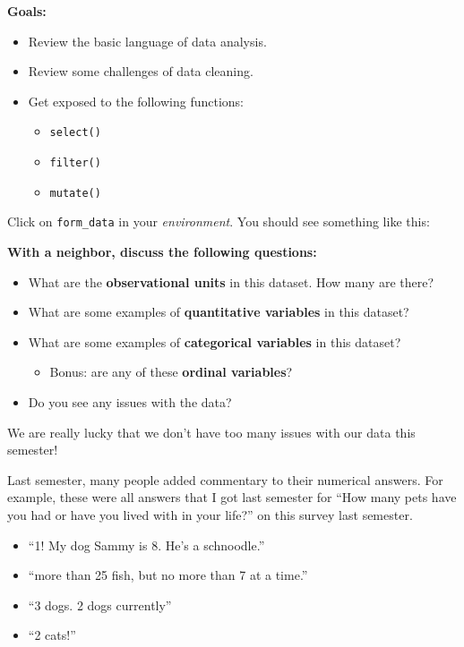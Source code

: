\documentclass[
]{article}
\makeatletter
\newcommand*\pandocbounded[1]{%
  \sbox\pandoc@box{#1}%
  \Gscale@div\@tempa{\textheight}{\dimexpr\ht\pandoc@box+\dp\pandoc@box\relax}%
  \Gscale@div\@tempb{\linewidth}{\wd\pandoc@box}%
  \ifdim\@tempb\p@<\@tempa\p@\let\@tempa\@tempb\fi%
  \ifdim\@tempa\p@<\p@\scalebox{\@tempa}{\usebox\pandoc@box}%
  \else\usebox{\pandoc@box}%
  \fi%
}
\providecommand{\tightlist}{%
  \setlength{\itemsep}{0pt}\setlength{\parskip}{0pt}}
\makeatother
\begin{document}
\label{boxedtext}
\textbf{Goals:}

\begin{itemize}
\tightlist
\item
  Review the basic language of data analysis.
\item
  Review some challenges of data cleaning.
\item
  Get exposed to the following functions:

  \begin{itemize}
  \tightlist
  \item
    \texttt{select()}
  \item
    \texttt{filter()}
  \item
    \texttt{mutate()}
  \end{itemize}
\end{itemize}

Click on \texttt{form\_data} in your \emph{environment}. You should see
something like this:

\pandocbounded{\texttt{[image: data.png]}}

\label{boxedtext}
\textbf{With a neighbor, discuss the following questions:}

\begin{itemize}
\tightlist
\item
  What are the \textbf{observational units} in this dataset. How many
  are there?
\item
  What are some examples of \textbf{quantitative variables} in this
  dataset?
\item
  What are some examples of \textbf{categorical variables} in this
  dataset?

  \begin{itemize}
  \tightlist
  \item
    Bonus: are any of these \textbf{ordinal variables}?
  \end{itemize}
\item
  Do you see any issues with the data?
\end{itemize}

We are really lucky that we don't have too many issues with our data
this semester!

Last semester, many people added commentary to their numerical answers.
For example, these were all answers that I got last semester for ``How
many pets have you had or have you lived with in your life?'' on this
survey last semester.

\begin{itemize}
\tightlist
\item
  ``1! My dog Sammy is 8. He's a schnoodle.''
\item
  ``more than 25 fish, but no more than 7 at a time.''
\item
  ``3 dogs. 2 dogs currently''\\
\item
  ``2 cats!''
\end{itemize}
\end{document}
